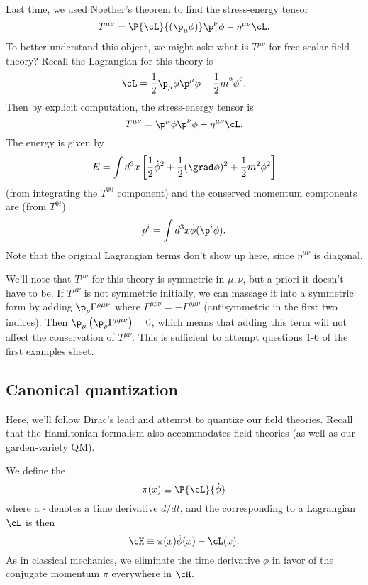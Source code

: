 Last time, we used Noether's theorem to find the stress-energy tensor
\begin{equation}
T^{\mu\nu}=\P{\cL}{(\p_\mu\phi)}\p^\nu \phi - \eta^{\mu\nu} \cL.
\end{equation}
To better understand this object, we might ask: what is $T^{\mu\nu}$ for free scalar field theory? Recall the Lagrangian for this theory is
\begin{equation}
\cL=\frac{1}{2}\p_\mu \phi \p^\mu \phi - \frac{1}{2} m^2 \phi^2.
\end{equation}
Then by explicit computation, the stress-energy tensor is
$$T^{\mu\nu}=\p^\mu \phi \p^\nu \phi - \eta^{\mu\nu} \cL.$$
The energy is given by 
$$E=\int d^3 x \left[\frac{1}{2} \dot \phi^2 +\frac{1}{2}(\grad \phi)^2 +\frac{1}{2}m^2 \phi^2 \right]$$
(from integrating the $T^{00}$ component) and the conserved momentum components are (from $T^{0i}$)
$$p^i= \int d^3x \dot \phi (\p^i \phi).$$
Note that the original Lagrangian terms don't show up here, since $\eta^{\mu\nu}$ is diagonal.

We'll note that $T^{\mu\nu}$ for this theory is symmetric in $\mu,\nu$, but a priori it doesn't have to be. If $T^{\mu\nu}$ is not symmetric initially, we can massage it into a symmetric form by adding $\p_\rho \Gamma^{\rho\mu\nu}$ where $\Gamma^{\mu\rho\nu}=-\Gamma^{\rho\mu\nu}$ (antisymmetric in the first two indices). Then $\p_\mu \left(\p_\rho \Gamma^{\rho\mu\nu}\right)=0$, which means that adding this term will not affect the conservation of $T^{\mu\nu}$. This is sufficient to attempt questions 1-6 of the first examples sheet.

\subsection*{Canonical quantization} Here, we'll follow Dirac's lead and attempt to quantize our field theories. Recall that the Hamiltonian formalism also accommodates field theories (as well as our garden-variety QM). 
\begin{defn}
We define the 
$$\pi(x)\equiv \P{\cL}{\dot \phi}$$
where a $\cdot$ denotes a time derivative $d/dt$, and the  corresponding to a Lagrangian $\cL$ is then
$$\cH \equiv \pi(x) \dot \phi(x) - \cL(x).$$
As in classical mechanics, we eliminate the time derivative $\dot\phi$ in favor of the conjugate momentum $\pi$ everywhere in $\cH$.
\end{defn}

